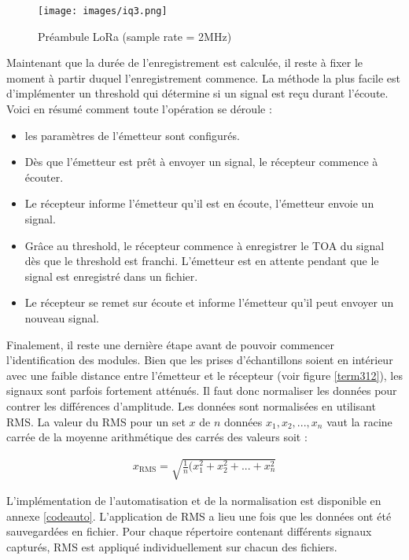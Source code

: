 \clearpage

\begin{figure}[h]
\centering

\texttt{[image: images/iq3.png]}
\caption{Préambule LoRa (sample rate = 2MHz)}\label{term311}
\end{figure}

Maintenant que la durée de l'enregistrement est calculée, il reste à fixer le moment à partir duquel l'enregistrement commence. La méthode la plus facile est d'implémenter un threshold qui détermine si un signal est reçu durant l'écoute. Voici en résumé comment toute l'opération se déroule :

\begin{itemize}
\item les paramètres de l'émetteur sont configurés. 
\item Dès que l'émetteur est prêt à envoyer un signal, le récepteur commence à écouter.
\item Le récepteur informe l'émetteur qu'il est en écoute, l'émetteur envoie un signal.
\item Grâce au threshold, le récepteur commence à enregistrer le \ac{TOA} du signal dès que le threshold est franchi. L'émetteur est en attente pendant que le signal est enregistré dans un fichier.
\item Le récepteur se remet sur écoute et informe l'émetteur qu'il peut envoyer un nouveau signal.
\end{itemize}

Finalement, il reste une dernière étape avant de pouvoir commencer l'identification des modules. Bien que les prises d'échantillons soient en intérieur avec une faible distance entre l'émetteur et le récepteur (voir figure \ref{term312}), les signaux sont parfois fortement atténués. Il faut donc normaliser les données pour contrer les différences d'amplitude. Les données sont normalisées en utilisant \ac{RMS}. La valeur du \ac{RMS} pour un set $x$ de $n$ données ${x_1,x_2,...,x_n}$ vaut la racine carrée de la moyenne arithmétique des carrés des valeurs soit :

\begin{align}
    x_\mathrm{RMS} = \sqrt{\frac{1}{n}(x_1^2 + x_2^2 + ... + x_n^2}
\end{align}

L'implémentation de l'automatisation et de la normalisation est disponible en annexe \ref{codeauto}. L'application de \ac{RMS} a lieu une fois que les données ont été sauvegardées en fichier. Pour chaque répertoire contenant différents signaux capturés, \ac{RMS} est appliqué individuellement sur chacun des fichiers.

